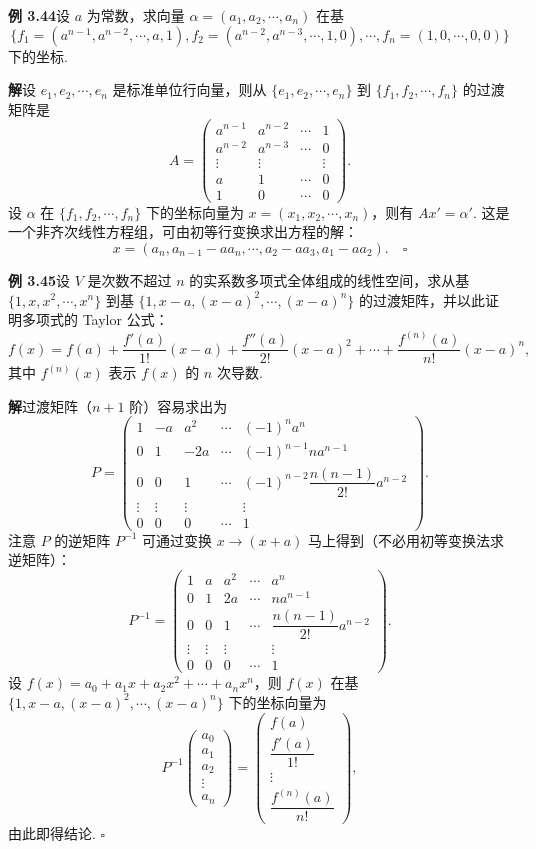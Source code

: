 \documentclass[UTF8, 12pt, fontset=fandol, oneside]{ctexart}
\begin{document}
\noindent\textbf{例 3.44}\quad 设 $a$ 为常数，求向量 $\alpha=(a_1,a_2,\cdots,a_n)$ 在基
\[
\{f_1=(a^{n-1},a^{n-2},\cdots,a,1),f_2=(a^{n-2},a^{n-3},\cdots,1,0),\cdots,f_n=(1,0,\cdots,0,0)\}
\]
下的坐标.

\noindent\textbf{解}\quad 设 $e_1,e_2,\cdots,e_n$ 是标准单位行向量，则从 $\{e_1,e_2,\cdots,e_n\}$ 到 $\{f_1,f_2,\cdots,f_n\}$ 的过渡矩阵是
\[
A=
\begin{pmatrix}
a^{n-1} & a^{n-2} & \cdots & 1\\
a^{n-2} & a^{n-3} & \cdots & 0\\
\vdots & \vdots &        & \vdots\\
a & 1 & \cdots & 0\\
1 & 0 & \cdots & 0
\end{pmatrix}.
\]
设 $\alpha$ 在 $\{f_1,f_2,\cdots,f_n\}$ 下的坐标向量为 $x=(x_1,x_2,\cdots,x_n)$，则有 $Ax'=\alpha'$. 这是一个非齐次线性方程组，可由初等行变换求出方程的解：
\[
x=(a_n,a_{n-1}-aa_n,\cdots,a_2-aa_3,a_1-aa_2). \quad \square
\]

\noindent\textbf{例 3.45}\quad 设 $V$ 是次数不超过 $n$ 的实系数多项式全体组成的线性空间，求从基 $\{1,x,x^2,\cdots,x^n\}$ 到基 $\{1,x-a,(x-a)^2,\cdots,(x-a)^n\}$ 的过渡矩阵，并以此证明多项式的 Taylor 公式：
\[
f(x)=f(a)+\frac{f'(a)}{1!}(x-a)+\frac{f''(a)}{2!}(x-a)^2+\cdots+\frac{f^{(n)}(a)}{n!}(x-a)^n,
\]
其中 $f^{(n)}(x)$ 表示 $f(x)$ 的 $n$ 次导数.

\noindent\textbf{解}\quad 过渡矩阵（$n+1$ 阶）容易求出为
\[
P=
\begin{pmatrix}
1 & -a & a^2 & \cdots & (-1)^n a^n\\
0 & 1 & -2a & \cdots & (-1)^{n-1}na^{n-1}\\
0 & 0 & 1 & \cdots & (-1)^{n-2}\dfrac{n(n-1)}{2!}a^{n-2}\\
\vdots & \vdots & \vdots &        & \vdots\\
0 & 0 & 0 & \cdots & 1
\end{pmatrix}.
\]
注意 $P$ 的逆矩阵 $P^{-1}$ 可通过变换 $x\to(x+a)$ 马上得到（不必用初等变换法求逆矩阵）：
\[
P^{-1}=
\begin{pmatrix}
1 & a & a^2 & \cdots & a^n\\
0 & 1 & 2a & \cdots & na^{n-1}\\
0 & 0 & 1 & \cdots & \dfrac{n(n-1)}{2!}a^{n-2}\\
\vdots & \vdots & \vdots &        & \vdots\\
0 & 0 & 0 & \cdots & 1
\end{pmatrix}.
\]
设 $f(x)=a_0+a_1x+a_2x^2+\cdots+a_nx^n$，则 $f(x)$ 在基 $\{1,x-a,(x-a)^2,\cdots,(x-a)^n\}$ 下的坐标向量为
\[
P^{-1}\begin{pmatrix}a_0\\a_1\\a_2\\\vdots\\a_n\end{pmatrix}
=
\begin{pmatrix}
f(a)\\
\dfrac{f'(a)}{1!}\\
\vdots\\
\dfrac{f^{(n)}(a)}{n!}
\end{pmatrix},
\]
由此即得结论. $\square$
\end{document}
